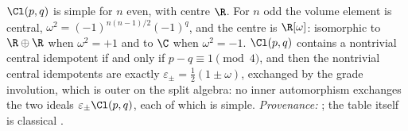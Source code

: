$\Cl(p,q)$ is simple for $n$ even, with centre $\R$. For $n$ odd the volume element is central, $\omega^2 = (-1)^{n(n-1)/2}(-1)^q$, and the centre is $\R[\omega]$: isomorphic to $\R \oplus \R$ when $\omega^2 = +1$ and to $\C$ when $\omega^2 = -1$. $\Cl(p,q)$ contains a nontrivial central idempotent if and only if $p - q \equiv 1 \pmod 4$, and then the nontrivial central idempotents are exactly $\varepsilon_\pm = \tfrac12(1 \pm \omega)$, exchanged by the grade involution, which is outer on the split algebra: no inner automorphism exchanges the two ideals $\varepsilon_\pm \Cl(p,q)$, each of which is simple. \emph{Provenance:} \cite[Thm.~2.5, Lemmas 2.6 and 2.7, Thm.~3.6]{ButlerT1}; the table itself is classical \cite{ABS1964, Lounesto2001}.
